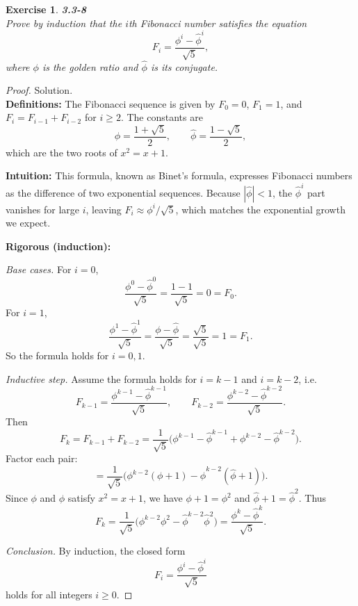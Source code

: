 \documentclass[12pt]{article}
\newtheorem{exercise}[theorem]{Exercise}
\theoremstyle{definition}
\begin{document}
\newpage

\begin{exercise}
\noindent
\textbf{3.3-8} \\
Prove by induction that the $i$th Fibonacci number satisfies the equation
\[
F_i=\frac{\phi^i-\hat{\phi}^i}{\sqrt{5}},
\]
where $\phi$ is the golden ratio and $\hat{\phi}$ is its conjugate.
\end{exercise}

\begin{proof}
Solution. \\

\noindent
\textbf{Definitions:}
The Fibonacci sequence is given by $F_0=0$, $F_1=1$, and $F_{i}=F_{i-1}+F_{i-2}$ for $i\ge 2$.  
The constants are
\[
\phi=\frac{1+\sqrt{5}}{2}, \qquad \hat{\phi}=\frac{1-\sqrt{5}}{2},
\]
which are the two roots of $x^2=x+1$.

\noindent
\textbf{Intuition:}
This formula, known as Binet’s formula, expresses Fibonacci numbers as the difference of two exponential sequences.
Because $|\hat{\phi}|<1$, the $\hat{\phi}^i$ part vanishes for large $i$, leaving $F_i\approx \phi^i/\sqrt{5}$, which matches the exponential growth we expect.

\noindent
\textbf{Rigorous (induction):}

\emph{Base cases.}
For $i=0$,
\[
\frac{\phi^0-\hat{\phi}^0}{\sqrt{5}}=\frac{1-1}{\sqrt{5}}=0=F_0.
\]
For $i=1$,
\[
\frac{\phi^1-\hat{\phi}^1}{\sqrt{5}}=\frac{\phi-\hat{\phi}}{\sqrt{5}}=\frac{\sqrt{5}}{\sqrt{5}}=1=F_1.
\]
So the formula holds for $i=0,1$.

\emph{Inductive step.}
Assume the formula holds for $i=k-1$ and $i=k-2$, i.e.
\[
F_{k-1}=\frac{\phi^{k-1}-\hat{\phi}^{k-1}}{\sqrt{5}}, 
\qquad
F_{k-2}=\frac{\phi^{k-2}-\hat{\phi}^{k-2}}{\sqrt{5}}.
\]
Then
\[
F_k=F_{k-1}+F_{k-2}
=\frac{1}{\sqrt{5}}\Big(\phi^{k-1}-\hat{\phi}^{k-1}+\phi^{k-2}-\hat{\phi}^{k-2}\Big).
\]
Factor each pair:
\[
=\frac{1}{\sqrt{5}}\Big(\phi^{k-2}(\phi+1)-\hat{\phi}^{k-2}(\hat{\phi}+1)\Big).
\]
Since $\phi$ and $\hat{\phi}$ satisfy $x^2=x+1$, we have $\phi+1=\phi^2$ and $\hat{\phi}+1=\hat{\phi}^2$. Thus
\[
F_k=\frac{1}{\sqrt{5}}\Big(\phi^{k-2}\phi^2-\hat{\phi}^{k-2}\hat{\phi}^2\Big)
=\frac{\phi^k-\hat{\phi}^k}{\sqrt{5}}.
\]

\emph{Conclusion.}  
By induction, the closed form
\[
F_i=\frac{\phi^i-\hat{\phi}^i}{\sqrt{5}}
\]
holds for all integers $i\ge 0$.
\end{proof}

\newpage
\end{document}
